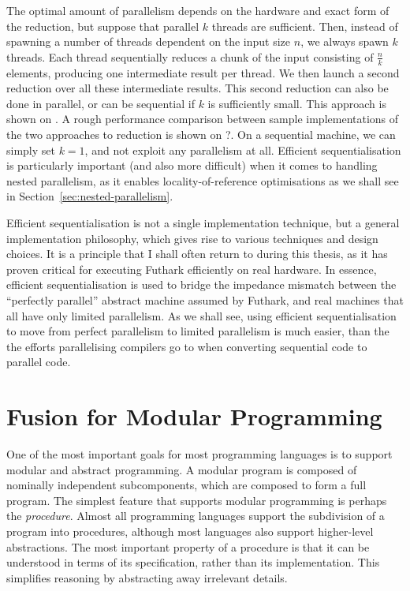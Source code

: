 The optimal amount of parallelism depends on the hardware and exact
form of the reduction, but suppose that parallel $k$ threads are
sufficient.  Then, instead of spawning a number of threads dependent
on the input size $n$, we always spawn $k$ threads.  Each thread
sequentially reduces a chunk of the input consisting of $\frac{n}{k}$
elements, producing one intermediate result per thread.  We then
launch a second reduction over all these intermediate results.  This
second reduction can also be done in parallel, or can be sequential if
$k$ is sufficiently small.  This approach is shown on
.  A rough performance comparison
between sample implementations of the two approaches to reduction is
shown on ?.  On a sequential machine,
we can simply set $k=1$, and not exploit any parallelism at all.
Efficient sequentialisation is particularly important (and also more
difficult) when it comes to handling nested parallelism, as it enables
locality-of-reference optimisations as we shall see in
Section~\ref{sec:nested-parallelism}.

Efficient sequentialisation is not a single implementation technique,
but a general implementation philosophy, which gives rise to various
techniques and design choices.  It is a principle that I shall often
return to during this thesis, as it has proven critical for executing
Futhark efficiently on real hardware.  In essence, efficient
sequentialisation is used to bridge the impedance mismatch between the
``perfectly parallel'' abstract machine assumed by Futhark, and real
machines that all have only limited parallelism.  As we shall see,
using efficient sequentialisation to move from perfect parallelism to
limited parallelism is much easier, than the the efforts parallelising
compilers go to when converting sequential code to parallel code.

\section{Fusion for Modular Programming}
\label{sec:fusion-for-modular-programming}

One of the most important goals for most programming languages is to
support modular and abstract programming.  A modular program is
composed of nominally independent subcomponents, which are composed to
form a full program.  The simplest feature that supports modular
programming is perhaps the \textit{procedure}.  Almost all programming
languages support the subdivision of a program into procedures,
although most languages also support higher-level abstractions.  The
most important property of a procedure is that it can be understood in
terms of its specification, rather than its implementation.  This
simplifies reasoning by abstracting away irrelevant details.

